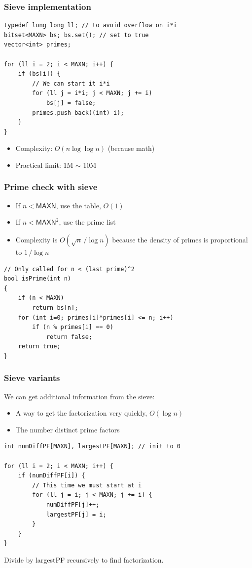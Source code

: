 \documentclass[12pt]{beamer}
\begin{document}
\begin{frame}[fragile]
\frametitle{Sieve implementation}
\begin{lstlisting}
typedef long long ll; // to avoid overflow on i*i
bitset<MAXN> bs; bs.set(); // set to true
vector<int> primes;

for (ll i = 2; i < MAXN; i++) {
    if (bs[i]) {
        // We can start it i*i
        for (ll j = i*i; j < MAXN; j += i)
            bs[j] = false;
        primes.push_back((int) i);
    }
}
\end{lstlisting}
\begin{itemize}
\item Complexity: $O(n \log \log n)$ (because math)
\item Practical limit: 1M $\sim$ 10M
\end{itemize}
\end{frame}

\begin{frame}[fragile]
\frametitle{Prime check with sieve}
\begin{itemize}
\item If $n < \mathsf{MAXN}$, use the table, $O(1)$
\item If $n < \mathsf{MAXN}^2$, use the prime list
\item Complexity is $O(\sqrt{n}\,/\log n)$ because the density of primes is proportional to $1\,/ \log n$
\end{itemize}
\begin{lstlisting}
// Only called for n < (last prime)^2
bool isPrime(int n)
{
    if (n < MAXN)
        return bs[n];
    for (int i=0; primes[i]*primes[i] <= n; i++)
        if (n % primes[i] == 0)
            return false;
    return true;
}
\end{lstlisting}
\end{frame}

\begin{frame}[fragile]
\frametitle{Sieve variants}
We can get additional information from the sieve:
\begin{itemize}
\item A way to get the factorization very quickly, $O(\log n)$
\item The number distinct prime factors
\end{itemize}
\begin{lstlisting}
int numDiffPF[MAXN], largestPF[MAXN]; // init to 0

for (ll i = 2; i < MAXN; i++) {
    if (numDiffPF[i]) {
        // This time we must start at i
        for (ll j = i; j < MAXN; j += i) {
            numDiffPF[j]++;
            largestPF[j] = i;
        }
    }
}
\end{lstlisting}
Divide by largestPF recursively to find factorization.
\end{frame}
\end{document}

